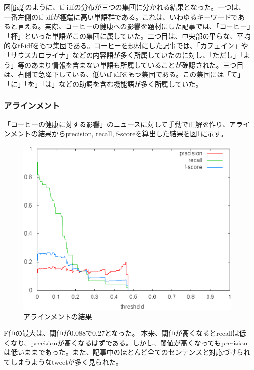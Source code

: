 \documentclass[12pt]{jarticle}
\begin{document}
図\ref{fig2}のように、tf-idfの分布が三つの集団に分かれる結果となった。一つは、一番左側のtf-idfが極端に高い単語群である。これは、いわゆるキーワードであると言える。実際、コーヒーの健康への影響を題材にした記事では、「コーヒー」「杯」といった単語がこの集団に属していた。二つ目は、中央部の平らな、平均的なtf-idfをもつ集団である。コーヒーを題材にした記事では、「カフェイン」や「サウスカロライナ」などの内容語が多く所属していたのに対し、「ただし」「よう」等のあまり情報を含まない単語も所属していることが確認された。三つ目は、右側で急降下している、低いtf-idfをもつ集団である。この集団には「て」「に」「を」「は」などの助詞を含む機能語が多く所属していた。

\subsubsection{アラインメント}
「コーヒーの健康に対する影響」のニュースに対して手動で正解を作り、アラインメントの結果からprecision, recall, f-scoreを算出した結果を図\ref{fig3}に示す。
\begin{figure}[htbp]
  \begin{center}
    \includegraphics[scale=0.5]{image/score.eps}
  \end{center}
  \caption{アラインメントの結果}
  \label{fig3}
\end{figure}

F値の最大は、閾値が0.088で0.27となった。
本来、閾値が高くなるとrecallは低くなり、precisionが高くなるはずである。しかし、閾値が高くなってもprecisionは低いままであった。また、記事中のほとんど全てのセンテンスと対応づけられてしまうようなtweetが多く見られた。
\end{document}
